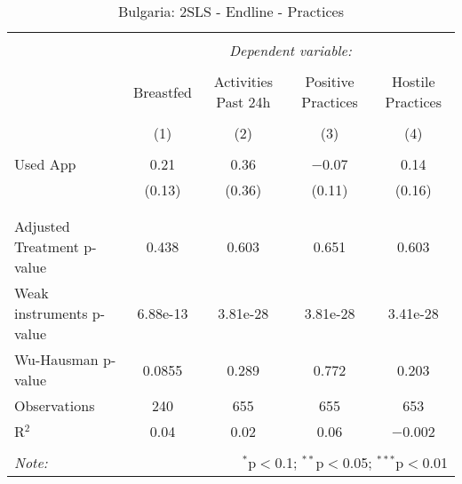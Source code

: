 
\begin{table}[!htbp] \centering 
  \caption{Bulgaria: 2SLS - Endline - Practices} 
  \label{tbl:Bulgaria: 2SLS - Endline - Practices} 
\begin{tabular}{@{\extracolsep{5pt}}lcccc} 
\\[-1.8ex]\hline 
\hline \\[-1.8ex] 
 & \multicolumn{4}{c}{\textit{Dependent variable:}} \\ 
\cline{2-5} 
\\[-1.8ex] & Breastfed & Activities Past 24h & Positive Practices & Hostile Practices \\ 
\\[-1.8ex] & (1) & (2) & (3) & (4)\\ 
\hline \\[-1.8ex] 
 Used App & 0.21 & 0.36 & $-$0.07 & 0.14 \\ 
  & (0.13) & (0.36) & (0.11) & (0.16) \\ 
  & & & & \\ 
\hline \\[-1.8ex] 
Adjusted Treatment p-value & 0.438 & 0.603 & 0.651 & 0.603 \\ 
Weak instruments p-value & 6.88e-13 & 3.81e-28 & 3.81e-28 & 3.41e-28 \\ 
Wu-Hausman p-value & 0.0855 & 0.289 & 0.772 & 0.203 \\ 
Observations & 240 & 655 & 655 & 653 \\ 
R$^{2}$ & 0.04 & 0.02 & 0.06 & $-$0.002 \\ 
\hline 
\hline \\[-1.8ex] 
\textit{Note:}  & \multicolumn{4}{r}{$^{*}$p$<$0.1; $^{**}$p$<$0.05; $^{***}$p$<$0.01} \\ 
\end{tabular} 
\end{table} 
